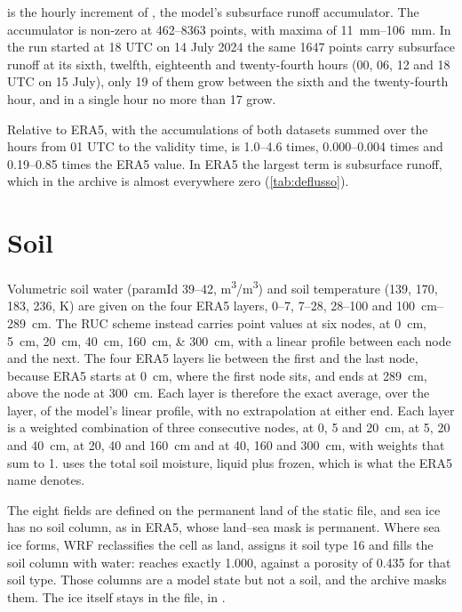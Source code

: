  is the hourly increment of , the model's subsurface runoff accumulator.
The accumulator is non-zero at \numrange{462}{8363} points, with maxima of \SIrange{11}{106}{mm}. In the
run started at 18 UTC on 14 July 2024 the same \num{1647} points carry subsurface runoff at its
sixth, twelfth, eighteenth and twenty-fourth hours (00, 06, 12 and 18 UTC on 15 July), only 19 of
them grow between the sixth and the twenty-fourth hour, and in a single hour no more than 17 grow.

Relative to ERA5, with the accumulations of both datasets summed over the hours from 01 UTC to
the validity time,  is \numrange{1.0}{4.6} times, 
\numrange{0.000}{0.004} times and  \numrange{0.19}{0.85} times the ERA5 value. In
ERA5 the largest term is subsurface runoff, which in the archive is almost everywhere zero
(\cref{tab:deflusso}).

\section{Soil}
\label{sec:suolo}

Volumetric soil water  (paramId 39--42, \si{m^3/m^3}) and soil temperature
 (139, 170, 183, 236, \si{K}) are given on the four ERA5 layers, 0--7, 7--28, 28--100
and \SIrange{100}{289}{cm}. The RUC scheme instead carries point values at six nodes, at
\SIlist{0;5;20;40;160;300}{cm}, with a linear profile between each node and the next. The four ERA5
layers lie between the first and the last node, because ERA5 starts at \SI{0}{cm}, where the first
node sits, and ends at \SI{289}{cm}, above the node at \SI{300}{cm}. Each layer is therefore the
exact average, over the layer, of the model's linear profile, with no extrapolation at either end.
Each layer is a weighted combination of three consecutive nodes, at 0, 5 and \SI{20}{cm}, at 5, 20
and \SI{40}{cm}, at 20, 40 and \SI{160}{cm} and at 40, 160 and \SI{300}{cm}, with weights that sum
to 1.  uses the total soil moisture, liquid plus frozen, which is what the ERA5 name
denotes.

The eight fields are defined on the permanent land of the static file, and sea ice has no soil
column, as in ERA5, whose land--sea mask is permanent. Where sea ice forms, WRF reclassifies the
cell as land, assigns it soil type 16 and fills the soil column with water:  reaches
exactly \num{1.000}, against a porosity of \num{0.435} for that soil type. Those columns are a model
state but not a soil, and the archive masks them. The ice itself stays in the file, in .

